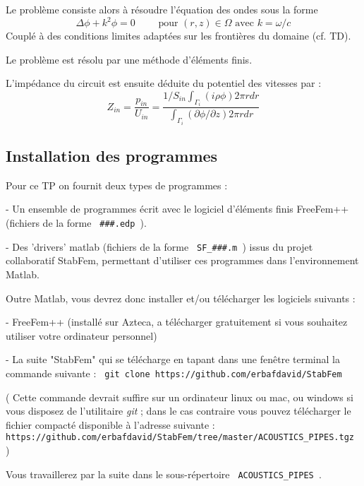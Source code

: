 \documentclass[11pt,a4paper]{article}
\begin{document}
Le problème consiste alors à résoudre l'équation des ondes sous la forme 
\begin{equation}
\Delta \phi + k^2 \phi = 0  \qquad \mbox{ pour } (r,z) \in \Omega \mbox{ avec } k = \omega/c
\label{eq:Ondes}
\end{equation}
Couplé à des conditions limites adaptées sur les frontières du domaine (cf. TD). 

Le problème est résolu par une méthode d'éléments finis.

L'impédance du circuit est ensuite déduite du potentiel des vitesses par :
$$
Z_{in} = \frac{p_{in} }{U_{in}} =  \frac{ 1/S_{in} \int_{\Gamma_i} (i \rho \phi)  2 \pi r dr  } 
{ \int_{\Gamma_i} (\partial \phi / \partial z) 2 \pi r dr } 
$$

\subsection{Installation des programmes}


Pour ce TP on fournit deux types de programmes : 

- Un ensemble de programmes écrit avec le logiciel d'éléments finis FreeFem++ (fichiers de la forme \verb| ###.edp |). 



- Des 'drivers' matlab (fichiers de la forme \verb| SF_###.m |)  issus du projet collaboratif StabFem, permettant d'utiliser ces programmes dans l'environnement Matlab.

Outre Matlab, vous devrez donc installer et/ou télécharger les logiciels suivants :

- FreeFem++ (installé sur Azteca,  a télécharger gratuitement si vous souhaitez utiliser votre ordinateur personnel)

- La suite "StabFem" qui se télécharge en tapant dans une fenêtre terminal la commande suivante : 
\verb| git clone https://github.com/erbafdavid/StabFem |

{\small 
(  Cette commande devrait suffire sur un ordinateur linux ou mac, ou windows si vous disposez de l'utilitaire {\em git } ;  dans le cas contraire vous pouvez télécharger le fichier compacté disponible à l'adresse suivante : 
\verb| https://github.com/erbafdavid/StabFem/tree/master/ACOUSTICS_PIPES.tgz  |
)
}

Vous travaillerez par la suite dans le sous-répertoire \verb| ACOUSTICS_PIPES |.
\end{document}

